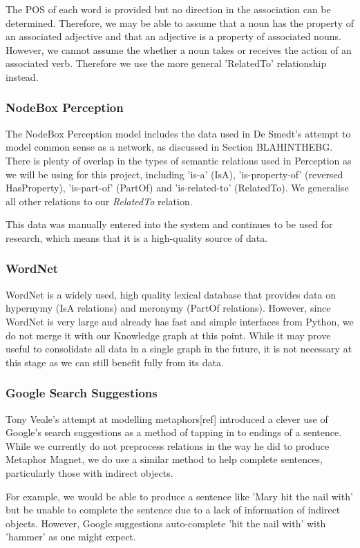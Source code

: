 The POS of each word is provided but no direction in the association can be determined. Therefore, we may be able to assume that a noun has the property of an associated adjective and that an adjective is a property of associated nouns. However, we cannot assume the whether a noun takes or receives the action of an associated verb. Therefore we use the more general 'RelatedTo' relationship instead.

\subsubsection{NodeBox Perception}
The NodeBox Perception model includes the data used in De Smedt's attempt to model common sense as a network, as discussed in Section BLAHINTHEBG. There is plenty of overlap in the types of semantic relations used in Perception as we will be using for this project, including 'is-a' (IsA), 'is-property-of' (reversed HasProperty), 'is-part-of' (PartOf) and 'is-related-to' (RelatedTo). We generalise all other relations to our \textit{RelatedTo} relation.

This data was manually entered into the system and continues to be used for research, which means that it is a high-quality source of data.

\subsubsection{WordNet}
WordNet is a widely used, high quality lexical database that provides data on hypernymy (IsA relations) and meronymy (PartOf relations). However, since WordNet is very large and already has fast and simple interfaces from Python, we do not merge it with our Knowledge graph at this point. While it may prove useful to consolidate all data in a single graph in the future, it is not necessary at this stage as we can still benefit fully from its data.


\subsubsection{Google Search Suggestions}
Tony Veale's attempt at modelling metaphors[ref] introduced a clever use of Google's search suggestions as a method of tapping in to endings of a sentence. While we currently do not preprocess relations in the way he did to produce Metaphor Magnet, we do use a similar method to help complete sentences, particularly those with indirect objects. 

For example, we would be able to produce a sentence like 'Mary hit the nail with' but be unable to complete the sentence due to a lack of information of indirect objects. However, Google suggestions auto-complete 'hit the nail with' with 'hammer' as one might expect. 

